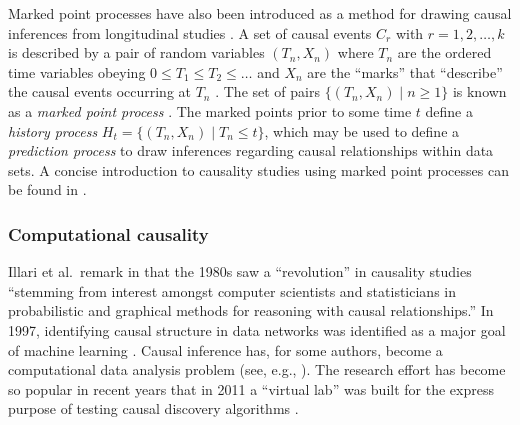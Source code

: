 \documentclass{article}[10pt]
\begin{document}
Marked point processes have also been introduced as a method for drawing causal inferences from longitudinal studies \cite{Arjas1993,Arjas2004}.  A set of causal events $C_r$ with $r=1,2,\ldots,k$ is described by a pair of random variables $(T_n,X_n)$ where $T_n$ are the ordered time variables obeying $0\le T_1\le T_2 \le\ldots$ and $X_n$ are the ``marks'' that ``describe'' the causal events occurring at $T_n$ \cite{Eerola2012}.  The set of pairs $\{(T_n,X_n)\;|\;n\ge 1\}$ is known as a {\em marked point process } \cite{Eerola2012}.  The marked points prior to some time $t$ define a {\em history process } $H_t = \{(T_n,X_n)\;|\;T_n\le t\}$, which may be used to define a {\em prediction process} to draw inferences regarding causal relationships within data sets.  A concise introduction to causality studies using marked point processes can be found in \cite{Eerola2012}.

\subsubsection{Computational causality}
Illari et al.\ remark in \cite{Illari2011b} that the 1980s saw a ``revolution'' in causality studies ``stemming from interest amongst computer scientists and statisticians in probabilistic and graphical methods for reasoning with causal relationships.''  In 1997, identifying causal structure in data networks was identified as a major goal of machine learning \cite{Ditterrich1997}.  Causal inference has, for some authors, become a computational data analysis problem (see, e.g., \cite{Pearl2000}).  The research effort has become so popular in recent years that in 2011 a ``virtual lab'' was built for the express purpose of testing causal discovery algorithms \cite{Guyon2011}.
\end{document}
